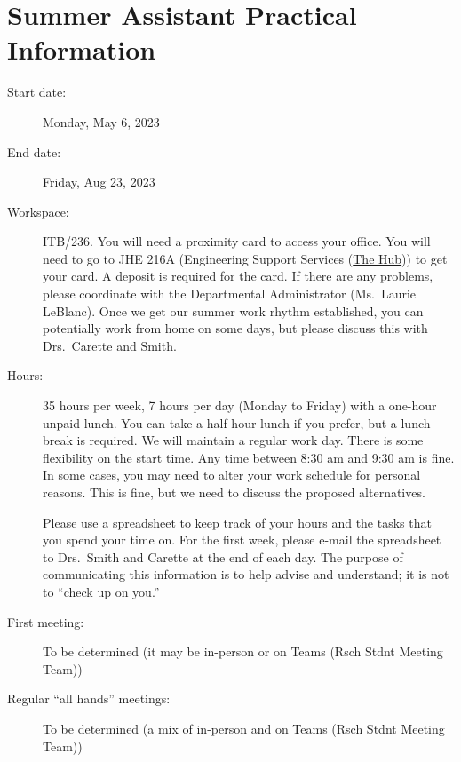 \documentclass[12pt]{article}
\begin{document}
\section{Summer Assistant Practical Information} \label{SecPractInfo}

\begin{description}

\item [Start date:] Monday, May 6, 2023

\item [End date:] Friday, Aug 23, 2023

\item [Workspace:] ITB/236. You will need a proximity card to access your
office.  You will need to go to JHE 216A (Engineering Support Services
(\href{https://www.eng.mcmaster.ca/engineering-support-services-hub/} {The
Hub})) to get your card.  A deposit is required for the card.  If there are any
problems, please coordinate with the Departmental Administrator (Ms.\ Laurie
LeBlanc).  Once we get our summer work rhythm established, you can potentially
work from home on some days, but please discuss this with Drs.\ Carette and
Smith.

\item [Hours:] 35 hours per week, 7 hours per day (Monday to Friday) with a
one-hour unpaid lunch.  You can take a half-hour lunch if you prefer, but a
lunch break is required. We will maintain a regular work day.  There is some
flexibility on the start time.  Any time between 8:30 am and 9:30 am is fine.
In some cases, you may need to alter your work schedule for personal reasons.
This is fine, but we need to discuss the proposed alternatives.

Please use a spreadsheet to keep track of your hours and the tasks that you
spend your time on.  For the first week, please e-mail the spreadsheet to Drs.\
Smith and Carette at the end of each day.  The purpose of communicating this
information is to help advise and understand; it is not to ``check up on you.''

\item [First meeting:] To be determined (it may be in-person or on Teams (Rsch
Stdnt Meeting Team))

\item [Regular ``all hands'' meetings:] To be determined (a mix of in-person and
on Teams (Rsch Stdnt Meeting Team))

\end{description}
\end{document}
